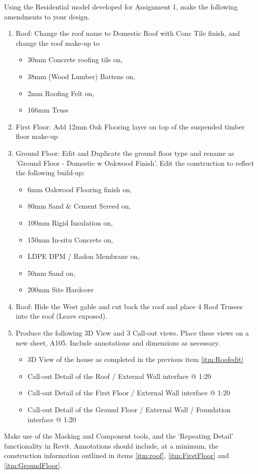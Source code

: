 Using the Residential model developed for Assignment 1, make the following amendments to your design.
\begin{enumerate}
	\item\label{itm:roof} Roof: Change the roof name to Domestic Roof with Conc Tile finish, and change the roof make-up to 
	\begin{itemize}
		\item 30mm Concrete roofing tile on,
		\item 38mm (Wood Lumber) Battens on,
		\item 2mm Roofing Felt on,
		\item 166mm Truss
	\end{itemize}
	\item\label{itm:FirstFloor} First Floor: Add 12mm Oak Flooring layer on top of the suspended timber floor make-up
	\item\label{itm:GroundFloor} Ground Floor: Edit and Duplicate the ground floor type and rename as 'Ground Floor - Domestic w Oakwood Finish'.  Edit the construction to reflect the following build-up:
	\begin{itemize}
		\item 6mm Oakwood Flooring finish on,
		\item 80mm Sand \& Cement Screed on,
		\item 100mm Rigid Insulation on,
		\item 150mm In-situ Concrete on,
		\item LDPE DPM / Radon Membrane on,
		\item 50mm Sand on,
		\item 200mm Site Hardcore
	\end{itemize}
	\item\label{itm:Roofedit} Roof: Hide the West gable and cut back the roof and place 4 Roof Trusses into the roof (Leave exposed).
	\item Produce the following 3D View and 3 Call-out views. Place these views on a new sheet, A105.  Include annotations and dimensions as necessary.
	\begin{itemize}
		\item 3D View of the house as completed in the previous item \ref{itm:Roofedit} 
		\item Call-out Detail of the Roof / External Wall interface @ 1:20
		\item Call-out Detail of the First Floor / External Wall interface @ 1:20
		\item Call-out Detail of the Ground Floor / External Wall / Foundation interface @ 1:20
	\end{itemize}
\end{enumerate}
Make use of the Masking and Component tools, and the 'Repeating Detail' functionality in Revit.  Annotations should include, at a minimum, the construction information outlined in items \ref{itm:roof}, \ref{itm:FirstFloor} and \ref{itm:GroundFloor}. 






